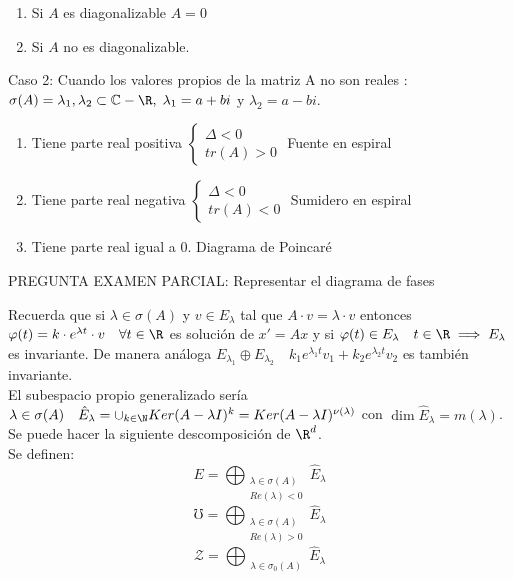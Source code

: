 \begin{nlist}
\begin{enumerate}
\item Si $A$ es diagonalizable $A=0$
\item Si $A$ no es diagonalizable.
\end{enumerate}


\item Caso 2: Cuando los valores propios de la matriz A no son reales : $\sigma(A)={\lambda_1,\lambda_2}\subset \mathbb{C} - \R, \; \lambda_1=a+bi$ y $ \lambda_2=a-bi$.
  
\begin{enumerate}
\item Tiene parte real positiva $\left\{\begin{array}{ll} \Delta < 0 \\ tr(A) > 0 \end{array}\right.$ Fuente en espiral
\item Tiene parte real negativa $\left\{\begin{array}{ll} \Delta < 0 \\ tr(A) < 0 \end{array}\right.$ Sumidero en espiral
\item Tiene parte real igual a 0. Diagrama de Poincaré
\end{enumerate}

\end{nlist}


\begin{ejemplo}
\end{ejemplo}

PREGUNTA EXAMEN PARCIAL: Representar el diagrama de fases

\begin{nota}
Recuerda que si $\lambda \in \sigma(A)$ y $v \in E_\lambda$ tal que $A\cdot v =\lambda\cdot v$ entonces $\varphi(t)=k\cdot e^{\lambda t}\cdot v \quad \forall t \in \R$ es solución de $x'=Ax$ y si $\varphi(t)\in E_\lambda \quad t \in \R \implies E_\lambda$ es invariante. De manera análoga $E_{\lambda_1}\oplus E_{\lambda_2} \quad k_1 e^{\lambda_1 t}v_1+k_2 e^{\lambda_2 t}v_2$ es también invariante.\\
El subespacio propio generalizado sería $\lambda\in\sigma(A) \quad \hat{E}_\lambda = \cup_{k\in\N}Ker(A-\lambda I)^k=Ker(A-\lambda I)^{\nu(\lambda) }$ con $\dim \hat{E}_\lambda=m(\lambda)$.\\
Se puede hacer la siguiente descomposición de $\R^d$.\\
Se definen:
$$E=\bigoplus_{ \begin{array}{c}\lambda\in\sigma(A)\\ Re(\lambda)<0\end{array}}\hat{E}_\lambda$$
$$\mho=\bigoplus_{\begin{array}{c}\lambda\in\sigma(A) \\ Re(\lambda)>0\end{array}}\hat{E}_\lambda$$
$$\mathcal{Z}=\bigoplus_{\begin{array}{c}\lambda\in\sigma_0(A)\end{array}}\hat{E}_\lambda$$
\end{nota}


